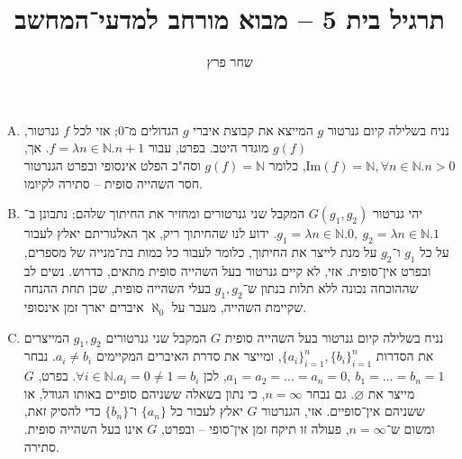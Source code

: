 \documentclass[]{article}
\author{שחר פרץ}
\title{תרגיל בית 5 – מבוא מורחב למדעי־המחשב}
\makeatletter
\newcommand{\skipitems}[1]{
	\addtocounter{\@enumctr}{#1}
}
\newcommand\N     {\mathbb{N}}
\newcommand\Img   {\mathrm{Im}}
\newcommand\az    {\aleph_0}
\renewcommand\inf {\infty}
\newcommand\setc[1]   {\{a_i\}^{#1}_{i = 1}}
\makeatother
\begin{document}
	\maketitle
	\section{}
	\section{}
	\begin{enumerate}[A.]
		\skipitems{2}
		\item נניח בשלילה קיום גנרטור $g$ המייצא את קבוצת איברי $g$ הגדולים מ־$0$; אזי לכל $f$ גנרטור, $g(f)$ מוגדר היטב. בפרט, עבור $f = \lambda n \in \N. n + 1$. אך, $\Img(f) = \N, \forall n \in \N. n > 0$, כלומר $g(f) = \N$ וסה"כ הפלט אינסופי ובפרט הגנרטור חסר השהייה סופית – סתירה לקיומו. 
		\skipitems{1}
		\item יהי גנרטור $G(g_1, g_2)$ המקבל שני גנרטורים ומחזיר את החיתוך שלהם; נתבונן ב־$g_1 = \lambda n \in \N. 0, \ g_2 = \lambda n \in \N. 1$. ידוע לנו שהחיתוך ריק, אך האלגוריתם יאלץ לעבור על כל $g_1$ ו־$g_2$ על מנת לייצר את החיתוך, כלומר לעבור כל כמות בת־מנייה של מספרים, ובפרט אין־סופית. אזי, לא קיים גנרטור בעל השהייה סופית מתאים, כדרוש. נשים לב שההוכחה נכונה ללא תלות בנתון ש־$g_1, g_2$ בעלי השהייה סופית, שכן תחת ההנחה שקיימת השהייה, מעבר על $\az$ איברים יארך זמן אינסופי. 
		\item נניח בשלילה קיום גנרטור בעל השהייה סופית $G$ המקבל שני גנרטורים $g_1, g_2$ המייצרים את הסדרות $\setc{n}, \{b_i\}_{i = 1}^{n}$, ומייצר את סדרת האיברים המקיימים $a_i \neq b_i$. נבחר $a_1 = a_2 = \dots = a_n = 0, \ b_1 = \dots = b_n = 1$, לכן $\forall i \in \N. a_i = 0 \neq 1 = b_i$. בפרט, $G$ מייצר את $\varnothing$. גם נבחר $n = \inf$, כי נתון בשאלה ששניהם סופיים באותו הגודל, או ששניהם אין־סופיים. אזי, הגנרטור $G$ יאלץ לעבור כל $\{a_n\}$ ו־$\{b_n\}$ כדי להסיק זאת, ומשום ש־$n = \inf$, פעולה זו תיקח זמן אין־סופי – ובפרט, $G$ אינו בעל השהייה סופית. סתירה. 
	\end{enumerate}
\end{document}
